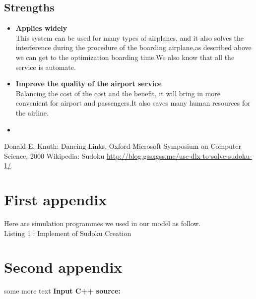 \documentclass{mcmthesis}
\begin{document}
\subsection{Strengths}
\begin{itemize}
	\item \textbf{Applies widely}\\
	This  system can be used for many types of airplanes, and it also
	solves the interference during  the procedure of the boarding
	airplane,as described above we can get to the  optimization
	boarding time.We also know that all the service is automate.
	\item \textbf{Improve the quality of the airport service}\\
	Balancing the cost of the cost and the benefit, it will bring in
	more convenient  for airport and passengers.It also saves many
	human resources for the airline. \item \textbf{}
\end{itemize}

\begin{thebibliography}{99}
 Donald E. Knuth: Dancing Links, Oxford-Microsoft Symposium on Computer Science, 2000
	Wikipedia: Sudoku
\url{http://blog.gssxgss.me/use-dlx-to-solve-sudoku-1/}
\end{thebibliography}

\begin{appendices}

\section{First appendix}

Here are simulation programmes we used in our model as follow.\\

\centering
Listing 1 : Implement of Sudoku Creation











\section{Second appendix}
some more text \textcolor[rgb]{0.98,0.00,0.00}{\textbf{Input C++ source:}}


\end{appendices}
\end{document}
